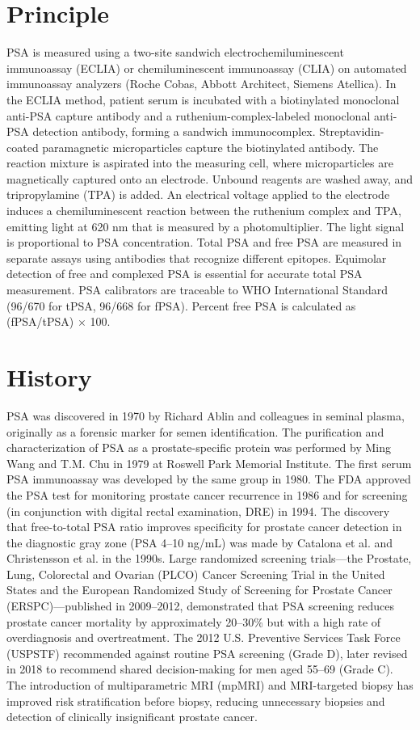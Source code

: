 \section*{Principle}
PSA is measured using a two-site sandwich electrochemiluminescent immunoassay (ECLIA) or chemiluminescent immunoassay (CLIA) on automated immunoassay analyzers (Roche Cobas, Abbott Architect, Siemens Atellica). In the ECLIA method, patient serum is incubated with a biotinylated monoclonal anti-PSA capture antibody and a ruthenium-complex-labeled monoclonal anti-PSA detection antibody, forming a sandwich immunocomplex. Streptavidin-coated paramagnetic microparticles capture the biotinylated antibody. The reaction mixture is aspirated into the measuring cell, where microparticles are magnetically captured onto an electrode. Unbound reagents are washed away, and tripropylamine (TPA) is added. An electrical voltage applied to the electrode induces a chemiluminescent reaction between the ruthenium complex and TPA, emitting light at 620 nm that is measured by a photomultiplier. The light signal is proportional to PSA concentration. Total PSA and free PSA are measured in separate assays using antibodies that recognize different epitopes. Equimolar detection of free and complexed PSA is essential for accurate total PSA measurement. PSA calibrators are traceable to WHO International Standard (96/670 for tPSA, 96/668 for fPSA). Percent free PSA is calculated as (fPSA/tPSA) $\times$ 100.

\section*{History}
PSA was discovered in 1970 by Richard Ablin and colleagues in seminal plasma, originally as a forensic marker for semen identification. The purification and characterization of PSA as a prostate-specific protein was performed by Ming Wang and T.M. Chu in 1979 at Roswell Park Memorial Institute. The first serum PSA immunoassay was developed by the same group in 1980. The FDA approved the PSA test for monitoring prostate cancer recurrence in 1986 and for screening (in conjunction with digital rectal examination, DRE) in 1994. The discovery that free-to-total PSA ratio improves specificity for prostate cancer detection in the diagnostic gray zone (PSA 4--10 ng/mL) was made by Catalona et al. and Christensson et al. in the 1990s. Large randomized screening trials---the Prostate, Lung, Colorectal and Ovarian (PLCO) Cancer Screening Trial in the United States and the European Randomized Study of Screening for Prostate Cancer (ERSPC)---published in 2009--2012, demonstrated that PSA screening reduces prostate cancer mortality by approximately 20--30\% but with a high rate of overdiagnosis and overtreatment. The 2012 U.S. Preventive Services Task Force (USPSTF) recommended against routine PSA screening (Grade D), later revised in 2018 to recommend shared decision-making for men aged 55--69 (Grade C). The introduction of multiparametric MRI (mpMRI) and MRI-targeted biopsy has improved risk stratification before biopsy, reducing unnecessary biopsies and detection of clinically insignificant prostate cancer.

